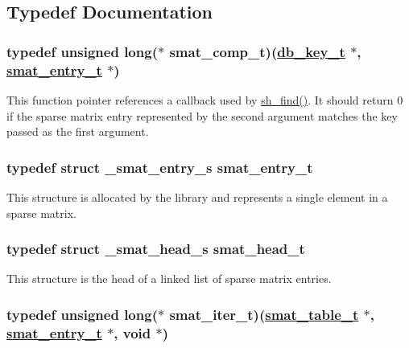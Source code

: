 \subsection{Typedef Documentation}
\hypertarget{group__dbprim__smat_a5}{
\subsubsection[smat\_\-comp\_\-t]{\setlength{\rightskip}{0pt plus 5cm}typedef unsigned long($\ast$ smat\_\-comp\_\-t)(\hyperlink{group__dbprim_a0}{db\_\-key\_\-t} $\ast$, \hyperlink{group__dbprim__smat_a2}{smat\_\-entry\_\-t} $\ast$)}}
\label{group__dbprim__smat_a5}


This function pointer references a callback used by \hyperlink{group__dbprim__smat_a19}{sh\_\-find()}. It should return 0 if the sparse matrix entry represented by the second argument matches the key passed as the first argument. \hypertarget{group__dbprim__smat_a2}{
\subsubsection[smat\_\-entry\_\-t]{\setlength{\rightskip}{0pt plus 5cm}typedef struct \_\-smat\_\-entry\_\-s smat\_\-entry\_\-t}}
\label{group__dbprim__smat_a2}


This structure is allocated by the library and represents a single element in a sparse matrix. \hypertarget{group__dbprim__smat_a1}{
\subsubsection[smat\_\-head\_\-t]{\setlength{\rightskip}{0pt plus 5cm}typedef struct \_\-smat\_\-head\_\-s smat\_\-head\_\-t}}
\label{group__dbprim__smat_a1}


This structure is the head of a linked list of sparse matrix entries. \hypertarget{group__dbprim__smat_a4}{
\subsubsection[smat\_\-iter\_\-t]{\setlength{\rightskip}{0pt plus 5cm}typedef unsigned long($\ast$ smat\_\-iter\_\-t)(\hyperlink{group__dbprim__smat_a0}{smat\_\-table\_\-t} $\ast$, \hyperlink{group__dbprim__smat_a2}{smat\_\-entry\_\-t} $\ast$, void $\ast$)}}
\label{group__dbprim__smat_a4}


